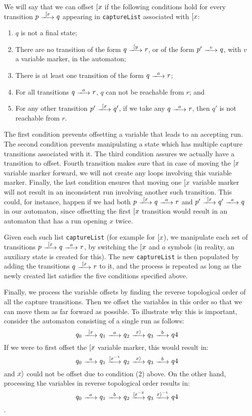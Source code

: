 We will say that we can offset $[ x$ if the following conditions hold for every transition $p\ \longtrans{\Open{x}}\ q$ appearing in \texttt{captureList} associated with $[ x$:
\begin{enumerate}
	\item $q$ is not a final state;
	\item There are no transition of the form $q\ \longtrans{\Open{y}}\ r$, or of the form $p'\ \longtrans{v}\ q$, with $v$ a variable marker, in the automaton;
	\item There is at least one transition of the form $q\ \longtrans{a}\ r$;
	\item For all transitions $q\ \longtrans{a}\ r$, $q$ can not be reachable from $r$; and
	\item For any other transition $p'\ \longtrans{\Open{x}}\ q'$, if we take any $q\ \longtrans{a}\ r$, then $q'$ is not reachable from $r$.
\end{enumerate}

The first condition prevents offsetting a variable that leads to an accepting run. The second condition prevents manipulating a state which has multiple capture transitions associated with it. The third condition assures we actually have a transition to offset. Fourth transition makes sure that in case of moving the $[ x$ variable marker forward, we will not create any loops involving this variable marker. Finally, the last condition ensures that moving one $[ x$ variable marker will not result in an inconsistent run involving another such transition. This could, for instance, happen if we had both $p\ \longtrans{\Open{x}}\ q\ \longtrans{a}\ r$ and $p'\ \longtrans{\Open{x}}\ q'\ \longtrans{a}\ q$ in our automaton, since offsetting the first $[ x$ transition would result in an automaton that has a run opening $x$ twice.

Given each such list \texttt{captureList} (for example for $[ x$), we manipulate each set of transitions $p\ \longtrans{\Open{x}}\ q\ \longtrans{a}\ r$, by switching the $[ x$ and $a$ symbols (in reality, an auxiliary state is created for this). The new \texttt{captureList} is then populated by adding the transitions $q\ \longtrans{\Open{x}}\ r$ to it, and the process is repeated as long as the newly created list satisfies the five conditions specified above.

Finally, we process the variable offsets by finding the reverse topological order of all the capture transitions.
Then we offset the variables in this order so that we can move them as far forward as possible. To illustrate why this is important, consider the automaton consisting of a single run as follows:
$$q_0\ \longtrans{\Open{x}}\ q_1\ \longtrans{a}\ q_2\ \longtrans{\Close{x}}\ q_3\ \longtrans{b}\ q4$$
If we were to first offset the $[ x$ variable marker, this would result in:
$$q_0\ \longtrans{a}\ q_1\ \longtrans{\Open{x}^{-1}}\ q_2\ \longtrans{\Close{x}}\ q_3\ \longtrans{b}\ q4$$
and $x \rangle$ could not be offset due to condition (2) above. On the other hand, processing the variables in reverse topological order results in:
$$q_0\ \longtrans{a}\ q_1\ \longtrans{b}\ q_2\ \longtrans{\Open{x}^{-2}}\ q_3\ \longtrans{\Close{x}^{-1}}\ q4$$.